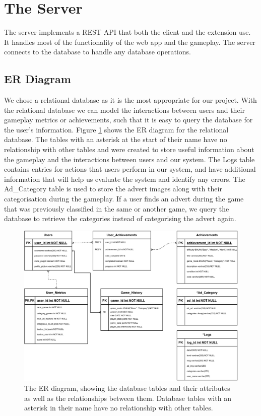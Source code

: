 \documentclass{l4proj}
\begin{document}
\section{The Server}
The server implements a REST API that both the client and the extension use. It handles most of the functionality of the web app and the gameplay. The server connects to the database to handle any database operations. 

\subsection{ER Diagram}
We chose a relational database as it is the most appropriate for our project. With the relational database we can model the interactions between users and their gameplay metrics or achievements, such that it is easy to query the database for the user's information. Figure \ref{fig:ER} shows the ER diagram for the relational database. The tables with an asterisk at the start of their name have no relationship with other tables and were created to store useful information about the gameplay and the interactions between users and our system. The Logs table contains entries for actions that users perform in our system, and have additional information that will help us evaluate the system and identify any errors. The Ad\_Category table is used to store the advert images along with their categorisation during the gameplay. If a user finds an advert during the game that was previously classified in the same or another game, we query the database to retrieve the categories instead of categorising the advert again.

\begin{figure}
    \centering
    \includegraphics[width=1\linewidth]{images/ER_diagram.pdf}    

    \caption{The ER diagram, showing the database tables and their attributes as well as the relationships between them. Database tables with an asterisk in their name have no relationship with other tables. }

    \label{fig:ER} 
\end{figure}
\end{document}
